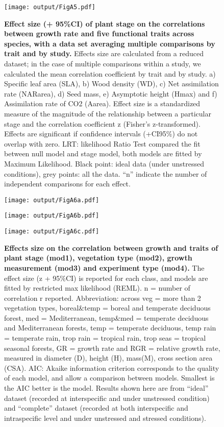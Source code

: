 \documentclass[a4paper,11pt]{article}
\begin{document}
\begin{appendices}
\begin{figure}[h!]
\centering
\texttt{[image: output/FigA5.pdf]}
\caption{\textbf{Effect size (+ 95\%CI) of plant stage on the correlations between growth rate and five functional traits across species, with a data set averaging multiple comparisons by trait and by study.} Effects size are calculated from a reduced dataset; in the case of multiple comparisons within a study, we calculated the mean correlation coefficient by trait and by study. a) Specific leaf area (SLA), b) Wood density (WD), c) Net assimilation rate (NARarea), d) Seed mass, e) Asymptotic height (Hmax) and f) Assimilation rate of CO2 (Aarea). Effect size is a standardized measure of the magnitude of the relationship between a particular stage and the correlation coefficient z (Fisher's z-transformed). Effects are significant if confidence intervals (+CI95\%) do not overlap with zero. LRT: likelihood Ratio Test compared the fit between null model and stage model, both models are fitted by Maximum Likelihood. Black point: ideal data (under unstressed conditions), grey points: all the data. ``n'' indicate the number of independent comparisons for each effect.}
\label{fig:figA5}
\end{figure}


\begin{figure}[h!]
\centering
\texttt{[image: output/FigA6a.pdf]}
\end{figure}

\begin{figure}[h!]
\centering
\texttt{[image: output/FigA6b.pdf]}
\end{figure}

\begin{figure}[h!]
\centering
\texttt{[image: output/FigA6c.pdf]}
\caption{\textbf{Effects size on the correlation between growth and traits of plant stage (mod1), vegetation type (mod2), growth measurement (mod3) and experiment type (mod4).} The effect size (z + 95\%CI) is reported for each class, and models are fitted by restricted max likelihood (REML). n = number of correlation r reported. Abbreviation: across veg = more than 2 vegetation types, boreal\&temp = boreal and temperate deciduous forest, med = Mediterranean,  temp\&med = temperate deciduous and Mediterranean forests, temp = temperate deciduous, temp rain = temperate rain, trop rain = tropical rain, trop seas = tropical seasonal forests, GR = growth rate and RGR = relative growth rate, measured in diameter (D), height (H), mass(M), cross section area (CSA). AIC: Akaike information criterion corresponds to the quality of each model, and allow a comparison between models. Smallest is the AIC better is the model. Results shown here are from ``ideal'' dataset (recorded at interspecific and under unstressed condition) and ``complete'' dataset (recorded at both interspecific and intraspecific level and under unstressed and stressed conditions).}
\label{fig:figA6}
\end{figure}


\end{appendices}
\end{document}
